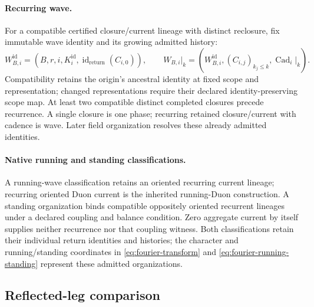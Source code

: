 \paragraph{Recurring wave.}
For a compatible certified closure/current lineage with distinct reclosure,
fix immutable wave identity and its growing admitted history:
\begin{equation}
W^{\mathrm{id}}_{B,i}=(B,r,i,K_i^{\mathrm{id}},
\operatorname{id}_{\mathrm{return}}(C_{i,0})),\qquad
W_{B,i}|_k=(W^{\mathrm{id}}_{B,i},(C_{i,j})_{k_j\le k},\operatorname{Cad}_i|_k).
\label{eq:wave-identity}
\end{equation}
Compatibility retains the origin's ancestral identity at fixed scope and
representation; changed representations require their declared identity-preserving
scope map. At least two compatible distinct completed closures precede recurrence. A single closure is one phase; recurring retained
closure/current with cadence is wave. Later field organization resolves these
already admitted identities.

\paragraph{Native running and standing classifications.}
A running-wave classification retains an oriented recurring current lineage;
recurring oriented Duon current is the inherited running-Duon construction.
A standing organization binds compatible oppositely oriented recurrent
lineages under a declared coupling and balance condition. Zero aggregate
current by itself supplies neither recurrence nor that coupling witness.
Both classifications retain their individual return identities and histories;
the character and running/standing coordinates in \eqref{eq:fourier-transform}
and \eqref{eq:fourier-running-standing} represent these admitted organizations.\label{eq:native-running-standing}

\subsection{Reflected-leg comparison}
\label{subsec:reflected-leg-phase}
